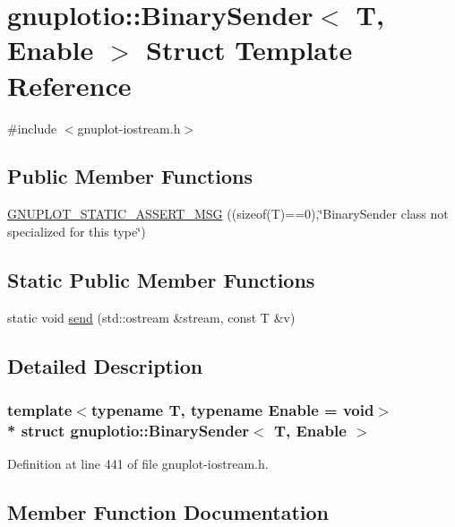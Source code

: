 \hypertarget{structgnuplotio_1_1_binary_sender}{}\section{gnuplotio\+:\+:Binary\+Sender$<$ T, Enable $>$ Struct Template Reference}
\label{structgnuplotio_1_1_binary_sender}


{\ttfamily \#include $<$gnuplot-\/iostream.\+h$>$}

\subsection*{Public Member Functions}
\begin{DoxyCompactItemize}
\item 
\hyperlink{structgnuplotio_1_1_binary_sender_a165c59a28adc4a90930925c6e0bfb0a9}{G\+N\+U\+P\+L\+O\+T\+\_\+\+S\+T\+A\+T\+I\+C\+\_\+\+A\+S\+S\+E\+R\+T\+\_\+\+M\+SG} ((sizeof(T)==0),\char`\"{}Binary\+Sender class not specialized for this type\char`\"{})
\end{DoxyCompactItemize}
\subsection*{Static Public Member Functions}
\begin{DoxyCompactItemize}
\item 
static void \hyperlink{structgnuplotio_1_1_binary_sender_a4b5dd22b7679c4f0ce4d8e75b36c8a21}{send} (std\+::ostream \&stream, const T \&v)
\end{DoxyCompactItemize}


\subsection{Detailed Description}
\subsubsection*{template$<$typename T, typename Enable = void$>$\\*
struct gnuplotio\+::\+Binary\+Sender$<$ T, Enable $>$}



Definition at line 441 of file gnuplot-\/iostream.\+h.



\subsection{Member Function Documentation}
